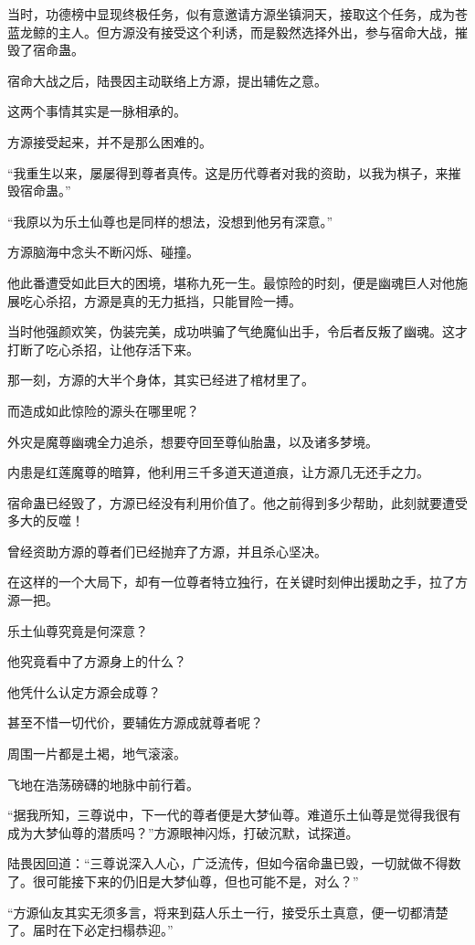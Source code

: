 \begin{this_body}
当时，功德榜中显现终极任务，似有意邀请方源坐镇洞天，接取这个任务，成为苍蓝龙鲸的主人。但方源没有接受这个利诱，而是毅然选择外出，参与宿命大战，摧毁了宿命蛊。

宿命大战之后，陆畏因主动联络上方源，提出辅佐之意。

这两个事情其实是一脉相承的。

方源接受起来，并不是那么困难的。

“我重生以来，屡屡得到尊者真传。这是历代尊者对我的资助，以我为棋子，来摧毁宿命蛊。”

“我原以为乐土仙尊也是同样的想法，没想到他另有深意。”

方源脑海中念头不断闪烁、碰撞。

他此番遭受如此巨大的困境，堪称九死一生。最惊险的时刻，便是幽魂巨人对他施展吃心杀招，方源是真的无力抵挡，只能冒险一搏。

当时他强颜欢笑，伪装完美，成功哄骗了气绝魔仙出手，令后者反叛了幽魂。这才打断了吃心杀招，让他存活下来。

那一刻，方源的大半个身体，其实已经进了棺材里了。

而造成如此惊险的源头在哪里呢？

外灾是魔尊幽魂全力追杀，想要夺回至尊仙胎蛊，以及诸多梦境。

内患是红莲魔尊的暗算，他利用三千多道天道道痕，让方源几无还手之力。

宿命蛊已经毁了，方源已经没有利用价值了。他之前得到多少帮助，此刻就要遭受多大的反噬！

曾经资助方源的尊者们已经抛弃了方源，并且杀心坚决。

在这样的一个大局下，却有一位尊者特立独行，在关键时刻伸出援助之手，拉了方源一把。

乐土仙尊究竟是何深意？

他究竟看中了方源身上的什么？

他凭什么认定方源会成尊？

甚至不惜一切代价，要辅佐方源成就尊者呢？

周围一片都是土褐，地气滚滚。

飞地在浩荡磅礴的地脉中前行着。

“据我所知，三尊说中，下一代的尊者便是大梦仙尊。难道乐土仙尊是觉得我很有成为大梦仙尊的潜质吗？”方源眼神闪烁，打破沉默，试探道。

陆畏因回道：“三尊说深入人心，广泛流传，但如今宿命蛊已毁，一切就做不得数了。很可能接下来的仍旧是大梦仙尊，但也可能不是，对么？”

“方源仙友其实无须多言，将来到菇人乐土一行，接受乐土真意，便一切都清楚了。届时在下必定扫榻恭迎。”


\end{this_body}
